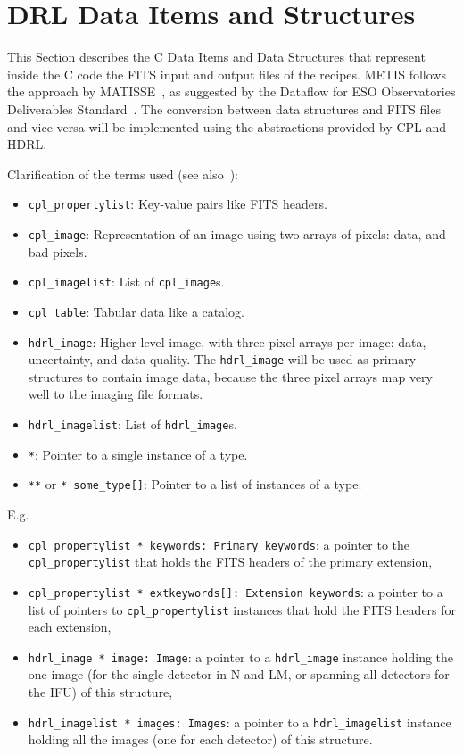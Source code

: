\clearpage
\section{DRL Data Items and Structures}\label{sec:drl_data_structures}


This Section describes the C Data Items and Data Structures that represent inside the C code the FITS input and output files of the recipes. \ac{METIS} follows the approach by MATISSE~\cite{MATISSE-DRLD}, as suggested by the Dataflow for ESO Observatories Deliverables Standard~\cite{1618}.
The conversion between data structures and \ac{FITS} files and vice versa will be implemented using the abstractions provided by \ac{CPL} and \ac{HDRL}. 

Clarification of the terms used (see also~\cite{hdrl-manual}):
\begin{itemize}
    \item \texttt{cpl\_propertylist}: Key-value pairs like \ac{FITS} headers.
    \item \texttt{cpl\_image}: Representation of an image using two arrays of pixels: data, and bad pixels.
    \item \texttt{cpl\_imagelist}: List of \texttt{cpl\_image}s.
    \item \texttt{cpl\_table}: Tabular data like a catalog.
    \item \texttt{hdrl\_image}: Higher level image, with three pixel arrays per image: data, uncertainty, and data quality.
          The \texttt{hdrl\_image} will be used as primary structures to contain image data, because the three pixel arrays map very well to the imaging file formats.
    \item \texttt{hdrl\_imagelist}: List of \texttt{hdrl\_image}s.
    \item \texttt{*}: Pointer to a single instance of a type.
    \item \texttt{**} or \texttt{* some_type[]}: Pointer to a list of instances of a type.
\end{itemize}

E.g.
\begin{itemize}
    \item \texttt{cpl\_propertylist * keywords: Primary keywords}: a pointer to the \texttt{cpl\_propertylist} that holds the \ac{FITS} headers of the primary extension,
    \item \texttt{cpl\_propertylist * extkeywords[]: Extension keywords}: a pointer to a list of pointers to \texttt{cpl\_propertylist} instances that hold the \ac{FITS} headers for each extension,
    \item \texttt{hdrl\_image * image: Image}: a pointer to a \texttt{hdrl\_image} instance holding the one image (for the single detector in N and LM, or spanning all detectors for the IFU) of this structure,
    \item \texttt{hdrl\_imagelist * images: Images}: a pointer to a \texttt{hdrl\_imagelist} instance holding all the images (one for each detector) of this structure.
\end{itemize}

